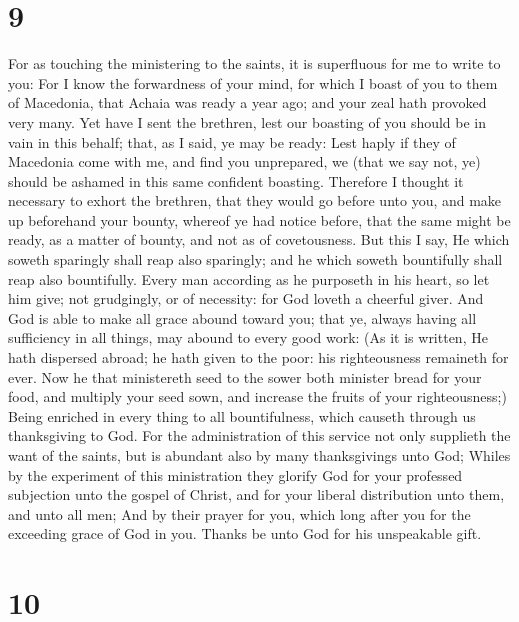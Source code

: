 \hypertarget{section-8}{%
\section{9}\label{section-8}}

 For as touching the ministering to the saints, it is
superfluous for me to write to you:  For I know the
forwardness of your mind, for which I boast of you to them of Macedonia,
that Achaia was ready a year ago; and your zeal hath provoked very many.
 Yet have I sent the brethren, lest our boasting of you
should be in vain in this behalf; that, as I said, ye may be ready:
 Lest haply if they of Macedonia come with me, and find you
unprepared, we (that we say not, ye) should be ashamed in this same
confident boasting.  Therefore I thought it necessary to
exhort the brethren, that they would go before unto you, and make up
beforehand your bounty, whereof ye had notice before, that the same
might be ready, as a matter of bounty, and not as of covetousness.
 But this I say, He which soweth sparingly shall reap also
sparingly; and he which soweth bountifully shall reap also bountifully.
 Every man according as he purposeth in his heart, so let
him give; not grudgingly, or of necessity: for God loveth a cheerful
giver.  And God is able to make all grace abound toward you;
that ye, always having all sufficiency in all things, may abound to
every good work:  (As it is written, He hath dispersed
abroad; he hath given to the poor: his righteousness remaineth for ever.
 Now he that ministereth seed to the sower both minister
bread for your food, and multiply your seed sown, and increase the
fruits of your righteousness;)  Being enriched in every
thing to all bountifulness, which causeth through us thanksgiving to
God.  For the administration of this service not only
supplieth the want of the saints, but is abundant also by many
thanksgivings unto God;  Whiles by the experiment of this
ministration they glorify God for your professed subjection unto the
gospel of Christ, and for your liberal distribution unto them, and unto
all men;  And by their prayer for you, which long after you
for the exceeding grace of God in you.  Thanks be unto God
for his unspeakable gift.

\hypertarget{section-9}{%
\section{10}\label{section-9}}

